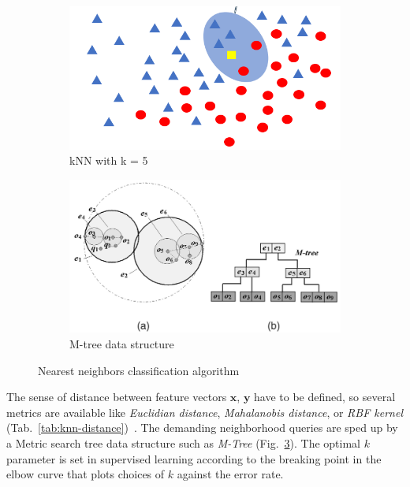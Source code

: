 \begin{figure}[ht]
    \centering
    \begin{subfigure}[b]{0.49\textwidth}
        \includegraphics[width=\textwidth]{assets/kNN.png}
        \caption{kNN with k = 5}
        \label{fig:knn}
    \end{subfigure}
    \hfill
    \begin{subfigure}[b]{0.49\textwidth}
        \includegraphics[width=\textwidth]{assets/M-tree.png}
        \caption{M-tree data structure}
        \label{fig:m-tree}
    \end{subfigure}
    \caption{Nearest neighbors classification algorithm~\cite{chen_skyline_2009}}
\end{figure}

The sense of distance between feature vectors $\mathbf{x}$, $\mathbf{y}$ have to be defined, so several metrics are available like \emph{Euclidian distance}, \emph{Mahalanobis distance}, or \emph{RBF kernel} (Tab.~\ref{tab:knn-distance})~\cite{sheng_review_2020}. The demanding neighborhood queries are sped up by a Metric search tree data structure such as \emph{M-Tree} (Fig.~\ref{fig:m-tree}). The optimal $k$ parameter is set in supervised learning according to the breaking point in the elbow curve that plots choices of $k$ against the error rate.

